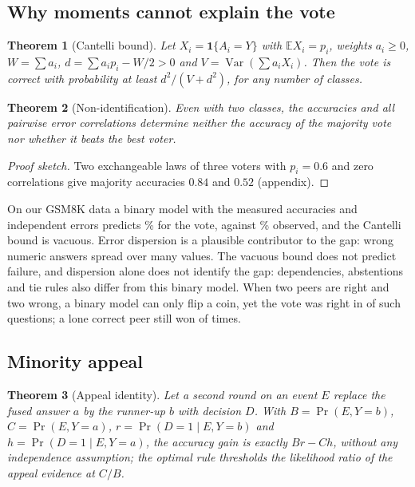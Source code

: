 \documentclass[11pt]{article}
\newtheorem{theorem}{Theorem}
\theoremstyle{definition}
\theoremstyle{remark}
\begin{document}
\subsection{Why moments cannot explain the vote}\label{sec:why}
\begin{theorem}[Cantelli bound]\label{thm:cantelli}
Let $X_i=\mathbf 1\{A_i=Y\}$ with $\mathbb E X_i=p_i$, weights $a_i\ge0$, $W=\sum a_i$,
$d=\sum a_ip_i-W/2>0$ and $V=\operatorname{Var}(\sum a_iX_i)$. Then the vote is correct with probability at
least $d^2/(V+d^2)$, for any number of classes.
\end{theorem}
\begin{theorem}[Non-identification]\label{thm:nonid}
Even with two classes, the accuracies and all pairwise error correlations determine neither the accuracy
of the majority vote nor whether it beats the best voter.
\end{theorem}
\begin{proof}[Proof sketch]
Two exchangeable laws of three voters with $p_i=0.6$ and zero correlations give majority accuracies
$0.84$ and $0.52$ (appendix).
\end{proof}
On our GSM8K data a binary model with the measured accuracies and independent errors predicts
\eTwoBinaryPred\% for the vote, against \eTwoVote\% observed, and the Cantelli bound is vacuous. Error dispersion is a
plausible contributor to the gap: wrong numeric answers spread over many values.
The vacuous bound does not predict failure, and dispersion alone does not identify the gap: dependencies,
abstentions and tie rules also differ from this binary model.
When two peers are right and two wrong, a binary model can only flip a coin, yet the vote was right in
\eTwoSplitTwoWon{} of \eTwoSplitTwoN{} such questions; a lone correct peer still won
\eTwoSplitOneWon{} of \eTwoSplitOneN{} times.

\subsection{Minority appeal}
\begin{theorem}[Appeal identity]\label{thm:appeal}
Let a second round on an event $E$ replace the fused answer $a$ by the runner-up $b$ with decision $D$.
With $B=\Pr(E,Y=b)$, $C=\Pr(E,Y=a)$, $r=\Pr(D=1\mid E,Y=b)$ and $h=\Pr(D=1\mid E,Y=a)$, the accuracy
gain is exactly $Br-Ch$, without any independence assumption; the optimal rule thresholds the likelihood
ratio of the appeal evidence at $C/B$.
\end{theorem}
\end{document}
